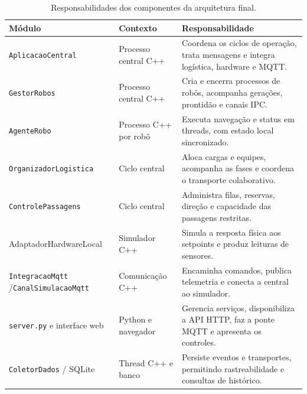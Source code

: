 \documentclass[12pt,a4paper]{article}
\newcommand{\code}[1]{\mbox{\texttt{#1}}}
\begin{document}
\begin{table}[H]
    \centering
    \scriptsize
    \caption{Responsabilidades dos componentes da arquitetura final.}
    \label{tab:responsabilidades}
    \begingroup
    \renewcommand{\arraystretch}{1.75}
    \begin{tabularx}{\textwidth}{@{}p{3.15cm}p{3.00cm}Y@{}}
        \toprule
        \textbf{Módulo}                                          & \textbf{Contexto}     & \textbf{Responsabilidade}                                                               \\
        \midrule
        \code{AplicacaoCentral}                                  & Processo central C++  & Coordena os ciclos de operação, trata mensagens e integra logística, hardware e MQTT.   \\
        \code{GestorRobos}                                       & Processo central C++  & Cria e encerra processos de robôs, acompanha gerações, prontidão e canais IPC.          \\
        \code{AgenteRobo}                                        & Processo C++ por robô & Executa navegação e status em threads, com estado local sincronizado.                   \\
        \code{OrganizadorLogistica}                              & Ciclo central         & Aloca cargas e equipes, acompanha as fases e coordena o transporte colaborativo.        \\
        \code{ControlePassagens}                                 & Ciclo central         & Administra filas, reservas, direção e capacidade das passagens restritas.               \\
        {\ttfamily\tiny AdaptadorHardwareLocal}                  & Simulador C++         & Simula a resposta física aos setpoints e produz leituras de sensores.                   \\
        \code{IntegracaoMqtt} /\newline\code{CanalSimulacaoMqtt} & Comunicação C++       & Encaminha comandos, publica telemetria e conecta a central ao simulador.                \\
        \code{server.py} e interface web                         & Python e navegador    & Gerencia serviços, disponibiliza a API HTTP, faz a ponte MQTT e apresenta os controles. \\
        \code{ColetorDados} / SQLite                             & Thread C++ e banco    & Persiste eventos e transportes, permitindo rastreabilidade e consultas de histórico.    \\
        \bottomrule
    \end{tabularx}
    \endgroup
\end{table}
\end{document}

